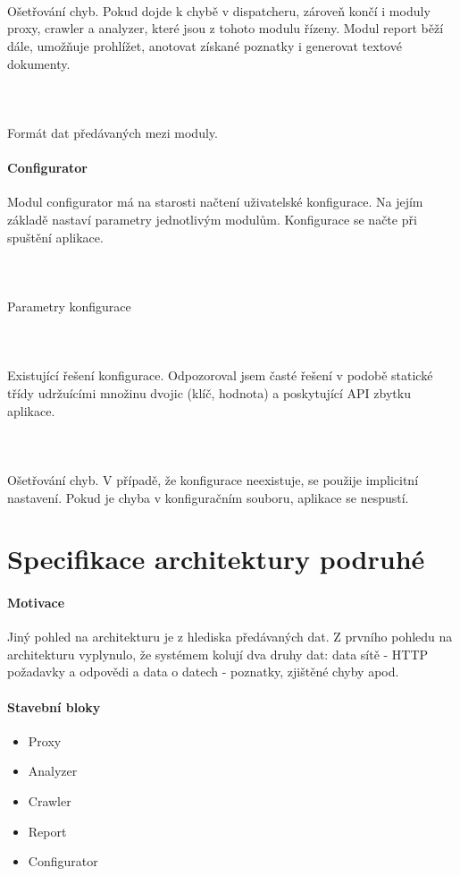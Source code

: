 \documentclass[10pt]{article}
\begin{document}
\paragraph{~} Ošetřování chyb. Pokud dojde k chybě v dispatcheru, zároveň končí i moduly proxy, crawler a analyzer, které jsou z tohoto modulu řízeny. Modul report běží dále, umožňuje prohlížet, anotovat získané poznatky i generovat textové dokumenty.
\paragraph{~} Formát dat předávaných mezi moduly.
\paragraph{Configurator} Modul configurator má na starosti načtení uživatelské konfigurace. Na jejím základě nastaví parametry jednotlivým modulům.  Konfigurace se načte při spuštění aplikace.
\paragraph{~}Parametry konfigurace
\paragraph{~}Existující řešení konfigurace. Odpozoroval jsem \v{c}ast\'e \v{r}e\v{s}en\'i v podob\v{e} statick\'e t\v{r}\'idy udr\v{z}u\'ic\'imi mno\v{z}inu dvojic (kl\'i\v{c}, hodnota) a poskytuj\'ic\'i API zbytku aplikace.
\paragraph{~}Ošetřování chyb. V případě, že konfigurace neexistuje, se použije implicitní nastavení. Pokud je chyba v konfiguračním souboru, aplikace se nespustí.
\section{Specifikace architektury podruh\'e}
\paragraph{Motivace} Jin\'y pohled na architekturu je z hlediska p\v{r}ed\'avan\'ych dat. Z prvn\'iho pohledu na architekturu vyplynulo, \v{z}e syst\'emem koluj\'i dva druhy dat: data s\'it\v{e} - HTTP po\v{z}adavky a odpov\v{e}di a data o datech - poznatky, zji\v{s}t\v{e}n\'e chyby apod.
\paragraph{Stavebn\'i bloky}
\begin{itemize}
	\item Proxy
	\item Analyzer
	\item Crawler
	\item Report
	\item Configurator
\end{itemize}
\end{document}
